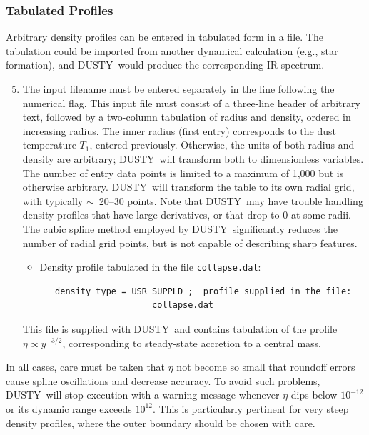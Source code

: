 \documentclass[11pt]{article}
\def\D  {{\sf DUSTY}}
\def\E#1{\hbox{$10^{#1}$}}
\def\about  {\hbox{$\sim$}}
\begin{document}
\subsubsection{Tabulated Profiles}

Arbitrary density profiles can be entered in tabulated form in a file.  The
tabulation could be imported from another dynamical calculation (e.g., star
formation), and \D\ would produce the corresponding IR spectrum.

\begin{enumerate}
\setcounter{enumi}{4}
\item The input filename must be entered separately in the line following
    the numerical flag. This input file must consist of a three-line header
    of arbitrary text, followed by a two-column tabulation of radius and
    density, ordered in increasing radius.  The inner radius (first entry)
    corresponds to the dust temperature $T_1$, entered previously.
    Otherwise, the units of both radius and density are arbitrary; \D\ will
    transform both to dimensionless variables. The number of entry data
    points is limited to a maximum of 1,000 but is otherwise arbitrary. \D\
    will transform the table to its own radial grid, with typically \about\
    20--30 points.  Note that \D\ may have trouble handling density
    profiles that have large derivatives, or that drop to 0 at some radii.
    The cubic spline method employed by \D\ significantly reduces the
    number of radial grid points, but is not capable of describing sharp
    features.

\begin{itemize}
\item Density profile tabulated in the file {\tt collapse.dat}:

\begin{verbatim}
   density type = USR_SUPPLD ;  profile supplied in the file:
                      collapse.dat
\end{verbatim}
\end{itemize}

This file is supplied with \D\ and contains tabulation of the profile $\eta
\propto y^{-3/2}$, corresponding to steady-state accretion to a central
mass.

\end{enumerate}

In all cases, care must be taken that $\eta$ not become so small that roundoff
errors cause spline oscillations and decrease accuracy.  To avoid such
problems, \D\ will stop execution with a warning message whenever $\eta$ dips
below \E{-12} or its dynamic range exceeds \E{12}.  This is particularly
pertinent for very steep density profiles, where the outer boundary should be
chosen with care.
\end{document}
